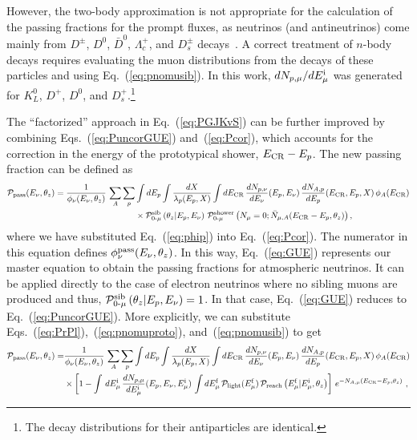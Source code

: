 \documentclass[aps,prd,showpacs,letterpaper,onecolumn,longbibliography,superscriptaddress,notitlepage,nofootinbib]{revtex4-1}%
\newcommand{\Emf}{E_{\mu}^{\rm f}}
\newcommand{\Emi}{E_{\mu}^{\rm i}}
\newcommand{\ECR}{E_{\rm CR}}
\newcommand{\Prob}{{\cal P}}
\newcommand{\Pzmproto}{\Prob_{0\text{-}\mu}^{\rm shower}}
\newcommand{\Pzmsib}{\Prob_{0\text{-}\mu}^{\rm sib}}
\begin{document}
However, the two-body approximation is not appropriate for the calculation of the passing fractions for the prompt fluxes, as neutrinos (and antineutrinos) come mainly from $D^{\pm}$, $D^0$, $\bar{D}^0$, $\Lambda_c^+$, and $D_s^{\pm}$ decays~\cite{Fedynitch:2015zma}. A correct treatment of $n$-body decays requires evaluating the muon distributions from the decays of these particles and using Eq.~(\ref{eq:pnomusib}). In this work, $dN_{p, \mu}/d\Emi$ was generated for $K^0_L$, $D^+$, $D^0$, and $D^+_s$.\footnote{The decay distributions for their antiparticles are identical.}

The ``factorized'' approach in Eq.~(\ref{eq:PGJKvS}) can be further improved by combining Eqs.~(\ref{eq:PuncorGUE}) and~(\ref{eq:Pcor}), which accounts for the correction in the energy of the prototypical shower, $\ECR - E_p$. The new passing fraction can be defined as
%
\begin{align}
\label{eq:GUE}
\Prob_{\rm pass}(E_\nu, \theta_z) = \frac{1}{\phi_\nu(E_\nu, \theta_z)} \, \sum_A \sum_{p} & \int dE_p  \int \frac{dX}{\lambda_p(E_p, X)} \int d\ECR \, \frac{dN_{p, \nu}}{dE_\nu}(E_p, E_\nu) \, \frac{dN_{A, p}}{dE_p}(\ECR, E_p, X) \, \phi_A(\ECR) \nonumber \\
& \times \Pzmsib \left(\theta_z|E_p, E_\nu \right) \, \Pzmproto\left(N_\mu=0;  \bar N_{\mu, A}(\ECR - E_p, \theta_z) \right),
\end{align}
%
where we have substituted Eq.~(\ref{eq:phip}) into Eq.~(\ref{eq:Pcor}). The numerator in this equation defines $\phi_\nu^{\rm pass}(E_\nu, \theta_z)$. In this way, Eq.~(\ref{eq:GUE}) represents our master equation to obtain the passing fractions for atmospheric neutrinos. It can be applied directly to the case of electron neutrinos where no sibling muons are produced and thus, $\Pzmsib \left(\theta_z | E_p, E_\nu \right) = 1$. In that case, Eq.~(\ref{eq:GUE}) reduces to Eq.~(\ref{eq:PuncorGUE}). More explicitly, we can substitute Eqs.~(\ref{eq:PrPl}),~(\ref{eq:pnomuproto}), and~(\ref{eq:pnomusib}) to get
%
\begin{align}
\label{eq:GUEexplicit}
\Prob_{\rm pass} (E_\nu, \theta_z) = & \frac{1}{\phi_\nu(E_\nu, \theta_z)} \, \sum_A \sum_{p} \int dE_p \int \frac{dX}{\lambda_p(E_p, X)} \int d\ECR \, \frac{dN_{p, \nu}}{dE_\nu}(E_p, E_\nu) \, \frac{dN_{A, p}}{dE_p}(\ECR, E_p, X) \, \phi_A(\ECR) \nonumber \\
& \times \left[ 1 - \int \, d\Emi \, \frac{dN_{p, \mu}}{d\Emi}(E_p, E_\nu, \Emi) \, \int d\Emf \, \Prob_{\rm light}(\Emf)  \, \Prob_{\rm reach}\left(\Emf | \Emi, \theta_z\right) \right] \, e^{-N_{A, \mu}(\ECR - E_p, \theta_z)}  ~,
\end{align}
%
\end{document}
